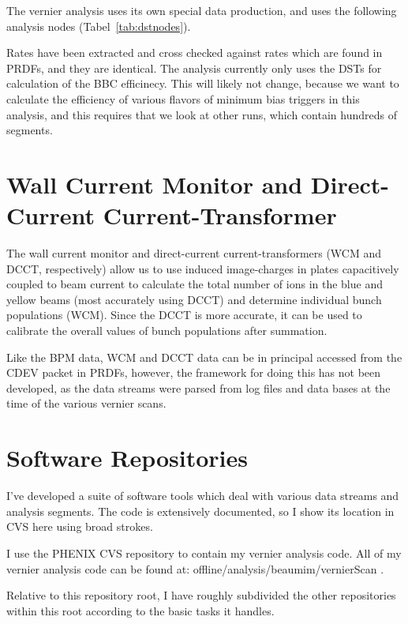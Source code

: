 The vernier analysis uses its own special data production, and uses the following analysis
nodes (Tabel~\ref{tab:dstnodes}).

Rates have been extracted and cross checked against rates which are found in PRDFs, and
they are identical. The analysis currently only uses the DSTs for calculation of the BBC
efficinecy. This will likely not change, because we want to calculate the efficiency of
various flavors of minimum bias triggers in this analysis, and this requires that we look
at other runs, which contain hundreds of segments. 



\section{Wall Current Monitor and Direct-Current Current-Transformer}
The wall current monitor and direct-current current-transformers (WCM and DCCT,
respectively) allow us to use induced image-charges in plates capacitively coupled to beam
current to calculate the total number of ions in the blue and yellow beams (most
accurately using DCCT) and determine individual bunch populations (WCM). Since the DCCT is
more accurate, it can be used to calibrate the overall values of bunch populations after
summation.

Like the BPM data, WCM and DCCT data can be in principal accessed from the CDEV packet in
PRDFs, however, the framework for doing this has not been developed, as the data streams
were parsed from log files and data bases at the time of the various vernier scans.




\section{Software Repositories}
I've developed a suite of software tools which deal with various data streams and analysis
segments. The code is extensively documented, so I show its location in CVS here using
broad strokes.

I use the PHENIX CVS repository to contain my vernier analysis code. All of my vernier
analysis code can be found at: offline/analysis/beaumim/vernierScan .

Relative to this repository root, I have roughly subdivided the other repositories within
this root according to the basic tasks it handles.

